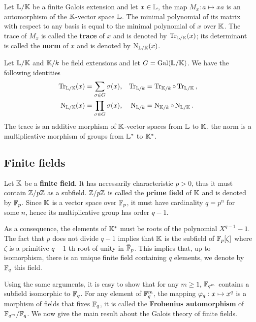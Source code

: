 Let $\mathbb{L}/\mathbb{K}$ be a finite Galois extension and let $x\in\mathbb{L}$, the map
$M_x:a\mapsto xa$ is an automorphism of the $\mathbb{K}$-vector space
$\mathbb{L}$. The minimal polynomial of its matrix with respect to any basis
is equal to the minimal polynomial of $x$ over $\mathbb{K}$.  The trace of
$M_x$ is called the \textbf{trace} of $x$
and is denoted by $\operatorname{Tr}_{\mathbb{L}/\mathbb{K}}(x)$; its determinant is called the
\textbf{norm} of $x$ and is denoted by
$\operatorname{N}_{\mathbb{L}/\mathbb{K}}(x)$.

\begin{proposition}
  \label{th:basic-galois-theory:trace}
  Let $\mathbb{L}/\mathbb{K}$ and $\mathbb{K}/k$ be field extensions and let
  $G=\operatorname{Gal}(\mathbb{L}/\mathbb{K})$. We have the following identities
  \begin{align*}
    \operatorname{Tr}_{\mathbb{L}/\mathbb{K}}(x) &= \sum_{\sigma\in G}\sigma(x) \text{,}&
    \operatorname{Tr}_{\mathbb{L}/k} &= \operatorname{Tr}_{\mathbb{K}/k}\circ\operatorname{Tr}_{\mathbb{L}/\mathbb{K}}\text{,}\\
    \operatorname{N}_{\mathbb{L}/\mathbb{K}}(x) &= \prod_{\sigma\in G}\sigma(x) \text{,}&
    \operatorname{N}_{\mathbb{L}/k} &= \operatorname{N}_{\mathbb{K}/k}\circ\operatorname{N}_{\mathbb{L}/\mathbb{K}}\text{.}
  \end{align*}
  The trace is an additive morphism of $\mathbb{K}$-vector spaces from $\mathbb{L}$
  to $\mathbb{K}$, the norm is a multiplicative morphism of groups from
  $\mathbb{L}^\ast$ to $\mathbb{K}^\ast$.
\end{proposition}


\subsection{Finite fields}
\label{sec:basic-galois-theory:finite-fields}

Let $\mathbb{K}$ be a   \textbf{finite
  field}. It has necessarily characteristic $p>0$, thus it must
contain $\mathbb{Z}/p\mathbb{Z}$ as a subfield. $\mathbb{Z}/p\mathbb{Z}$ is called the
 \textbf{prime field} of $\mathbb{K}$
and is denoted by $\mathbb{F}_p$. Since $\mathbb{K}$ is a vector space over $\mathbb{F}_p$, it
must have cardinality $q=p^n$ for some $n$, hence its multiplicative
group has order $q-1$.

As a consequence, the elements of $\mathbb{K}^\ast$ must be roots of the
polynomial $X^{q-1}-1$. The fact that $p$ does not divide $q-1$
implies that $\mathbb{K}$ is the subfield of $\mathbb{F}_p[\zeta]$ where $\zeta$ is a
primitive $q-1$-th root of unity in $\bar{\mathbb{F}}_p$. This implies that,
up to isomorphism, there is an unique finite field containing $q$
elements, we denote by $\mathbb{F}_q$ this field.

Using the same arguments, it is easy to show that for any $m\ge 1$,
$\mathbb{F}_{q^m}$ contains a subfield isomorphic to $\mathbb{F}_q$.  For any element
of $\mathbb{F}_q^m$, the mapping $\varphi_q:x\mapsto x^q$ is a morphism of
fields that fixes $\mathbb{F}_q$, it is called the
\textbf{Frobenius automorphism} of
$\mathbb{F}_{q^m}/\mathbb{F}_q$. We now give the main result about the Galois theory
of finite fields.

